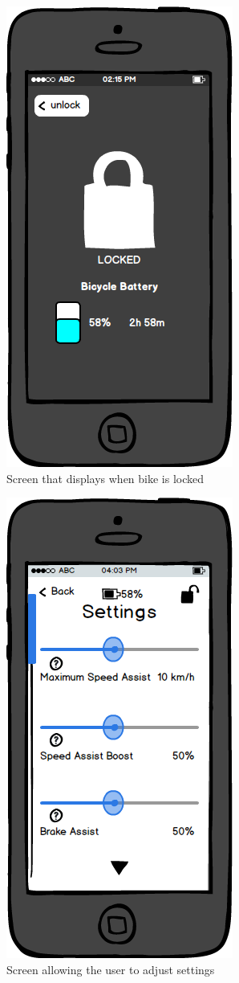 \documentclass[a4paper]{report}
\begin{document}
\clearpage
\begin{figure}
\centering
\includegraphics[scale=0.9]{figures/prototype_1/locked}
\caption{Screen that displays when bike is locked}
\end{figure}
\clearpage
\begin{figure}
\centering
\includegraphics[scale=0.9]{figures/prototype_1/settings}
\caption{Screen allowing the user to adjust settings}
\end{figure}
\end{document}
